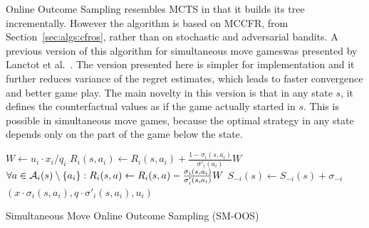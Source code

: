Online Outcome Sampling resembles MCTS in that it builds its tree incrementally. However the algorithm is based on MCCFR, from
Section~\ref{sec:algs:cfros}, rather than on stochastic and adversarial bandits.
A previous version of this algorithm for simultaneous move gameswas presented by Lanctot et al.~\cite{Lanctot13Goofspiel}. The version presented
here is simpler for implementation and it further reduces variance of the regret estimates, which leads to faster convergence and better game play.
The main novelty in this version is that in any state $s$, it defines the counterfactual values as if the game actually started in $s$. This is
possible in simultaneous move games, because the optimal strategy in any state depends only on the part of the game below the state.

\begin{algorithm2e}[t!]
\small
{}
   \label{alg:oos:terminal}
  $W \gets u_i \cdot x_i/q_i$\;  \label{alg:oos:update1}
  $R_i(s,a_i) \gets  R_i(s,a_i) + \frac{1-\sigma_i(s,a_i)}{\sigma'_i(a_i)}W$\;
  $\forall a\in\mathcal{A}_i(s)\setminus\{a_i\}: R_i(s,a) \gets R_i(s,a) - \frac{\sigma_i(s,a_i)}{\sigma'_i(s,a_i)}W$\; \label{alg:oos:update2}
  $S_{-i}(s) \gets S_{-i}(s) + \sigma_{-i}$\; \label{alg:oos:update3}
  \Return $(x\cdot \sigma_i(s,a_i), q\cdot \sigma'_i(s,a_i), u_i)$\; \label{alg:returnend}
  \vspace{0.1cm}
  \caption{Simultaneous Move Online Outcome Sampling (SM-OOS)  \label{alg:oos}}
\end{algorithm2e}

